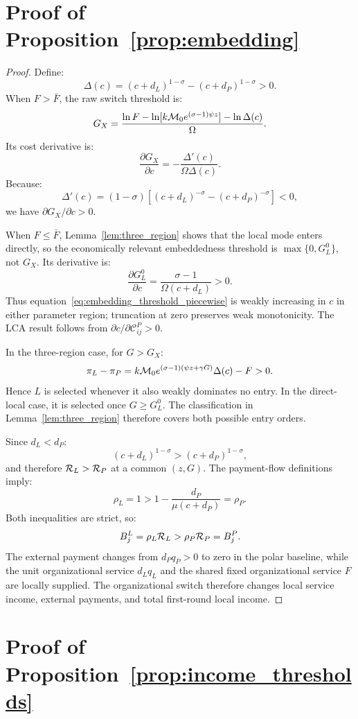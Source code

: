 \section{Proof of Proposition~\ref{prop:embedding}}

\begin{proof}
Define:
\[
\Delta(c)
=(c+d_L)^{1-\sigma}-(c+d_P)^{1-\sigma}>0.
\]
When \(F>\bar F\), the raw switch threshold is:
\[
G_X
=
\frac{\ln F-\ln[k\mathcal M_0e^{(\sigma-1)\psi z}]-\ln\Delta(c)}
{\Omega}.
\]
Its cost derivative is:
\[
\frac{\partial G_X}{\partial c}
=-\frac{\Delta'(c)}{\Omega\Delta(c)}.
\]
Because:
\[
\Delta'(c)
=(1-\sigma)
\left[(c+d_L)^{-\sigma}-(c+d_P)^{-\sigma}\right]<0,
\]
we have \(\partial G_X/\partial c>0\).

When \(F\leq\bar F\), Lemma~\ref{lem:three_region} shows that the local mode
enters directly, so the economically relevant embeddedness threshold is
\(\max\{0,G_L^0\}\), not \(G_X\).  Its derivative is:
\[
\frac{\partial G_L^0}{\partial c}
=
\frac{\sigma-1}{\Omega(c+d_L)}>0.
\]
Thus equation~\eqref{eq:embedding_threshold_piecewise} is weakly increasing in
\(c\) in either parameter region; truncation at zero preserves weak
monotonicity.  The LCA result follows from
\(\partial c/\partial\mathcal C^P_{ij}>0\).

In the three-region case, for \(G>G_X\):
\[
\pi_L-\pi_P
=
k\mathcal M_0e^{(\sigma-1)(\psi z+\gamma G)}\Delta(c)-F>0.
\]
Hence \(L\) is selected whenever it also weakly dominates no entry.  In the
direct-local case, it is selected once \(G\geq G_L^0\).  The classification in
Lemma~\ref{lem:three_region} therefore covers both possible entry orders.

Since \(d_L<d_P\):
\[
(c+d_L)^{1-\sigma}>(c+d_P)^{1-\sigma},
\]
and therefore \(\mathcal R_L>\mathcal R_P\) at a common \((z,G)\).  The payment-flow
definitions imply:
\[
\rho_L=1>
1-\frac{d_P}{\mu(c+d_P)}
=\rho_P.
\]
Both inequalities are strict, so:
\[
B_j^L=\rho_L\mathcal R_L
>
\rho_P\mathcal R_P=B_j^P.
\]
The external payment changes from \(d_Pq_P>0\) to zero in the polar baseline,
while the unit organizational service \(d_Lq_L\) and the shared fixed
organizational service \(F\) are locally supplied.  The organizational switch
therefore changes local service income, external payments, and total
first-round local income.
\end{proof}

\section{Proof of Proposition~\ref{prop:income_thresholds}}

